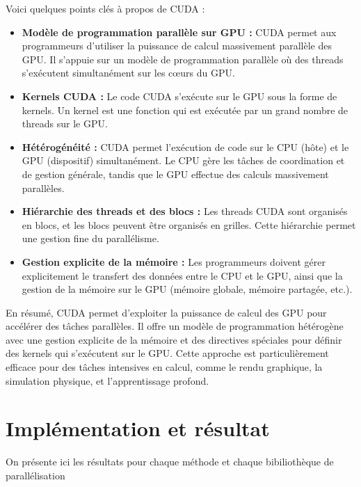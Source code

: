 \documentclass[10pt,a4paper]{article}
\begin{document}
Voici quelques points clés à propos de CUDA :

\begin{itemize}
    
    \item \textbf{Modèle de programmation parallèle sur GPU :} CUDA permet aux programmeurs d'utiliser la puissance de calcul massivement parallèle des GPU. Il s'appuie sur un modèle de programmation parallèle où des threads s'exécutent simultanément sur les cœurs du GPU.
    
    \item \textbf{Kernels CUDA :} Le code CUDA s'exécute sur le GPU sous la forme de kernels. Un kernel est une fonction qui est exécutée par un grand nombre de threads sur le GPU.
    
    \item \textbf{Hétérogénéité :} CUDA permet l'exécution de code sur le CPU (hôte) et le GPU (dispositif) simultanément. Le CPU gère les tâches de coordination et de gestion générale, tandis que le GPU effectue des calculs massivement parallèles.
    
    \item \textbf{Hiérarchie des threads et des blocs :} Les threads CUDA sont organisés en blocs, et les blocs peuvent être organisés en grilles. Cette hiérarchie permet une gestion fine du parallélisme.
    
    \item \textbf{Gestion explicite de la mémoire :} Les programmeurs doivent gérer explicitement le transfert des données entre le CPU et le GPU, ainsi que la gestion de la mémoire sur le GPU (mémoire globale, mémoire partagée, etc.).
\end{itemize}


En résumé, CUDA permet d'exploiter la puissance de calcul des GPU pour accélérer des tâches parallèles. Il offre un modèle de programmation hétérogène avec une gestion explicite de la mémoire et des directives spéciales pour définir des kernels qui s'exécutent sur le GPU. Cette approche est particulièrement efficace pour des tâches intensives en calcul, comme le rendu graphique, la simulation physique, et l'apprentissage profond.

\clearpage
\section{Implémentation et résultat}
On présente ici les résultats pour chaque méthode et chaque bibiliothèque de parallélisation
\end{document}
